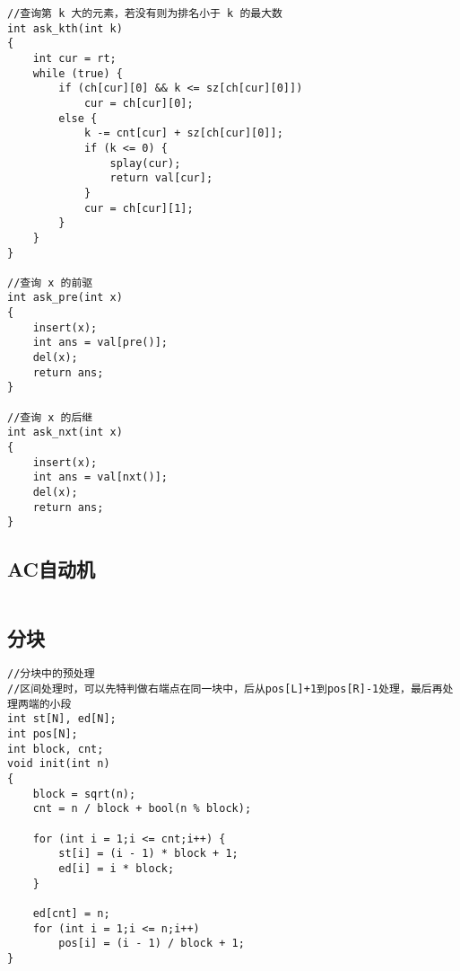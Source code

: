 \documentclass[twocolumn,a4]{article}
\begin{document}
\begin{lstlisting}
//查询第 k 大的元素，若没有则为排名小于 k 的最大数
int ask_kth(int k)
{
    int cur = rt;
    while (true) {
        if (ch[cur][0] && k <= sz[ch[cur][0]])
            cur = ch[cur][0];
        else {
            k -= cnt[cur] + sz[ch[cur][0]];
            if (k <= 0) {
                splay(cur);
                return val[cur];
            }
            cur = ch[cur][1];
        }
    }
}

//查询 x 的前驱
int ask_pre(int x)
{
    insert(x);
    int ans = val[pre()];
    del(x);
    return ans;
}

//查询 x 的后继
int ask_nxt(int x)
{
    insert(x);
    int ans = val[nxt()];
    del(x);
    return ans;
}
\end{lstlisting}

\subsection{AC自动机}
\begin{lstlisting}

\end{lstlisting}

\subsection{分块}
\begin{lstlisting}
//分块中的预处理
//区间处理时，可以先特判做右端点在同一块中，后从pos[L]+1到pos[R]-1处理，最后再处理两端的小段
int st[N], ed[N];
int pos[N];
int block, cnt;
void init(int n)
{
    block = sqrt(n);
    cnt = n / block + bool(n % block);

    for (int i = 1;i <= cnt;i++) {
        st[i] = (i - 1) * block + 1;
        ed[i] = i * block;
    }

    ed[cnt] = n;
    for (int i = 1;i <= n;i++)
        pos[i] = (i - 1) / block + 1;
}
\end{lstlisting}
\end{document}
